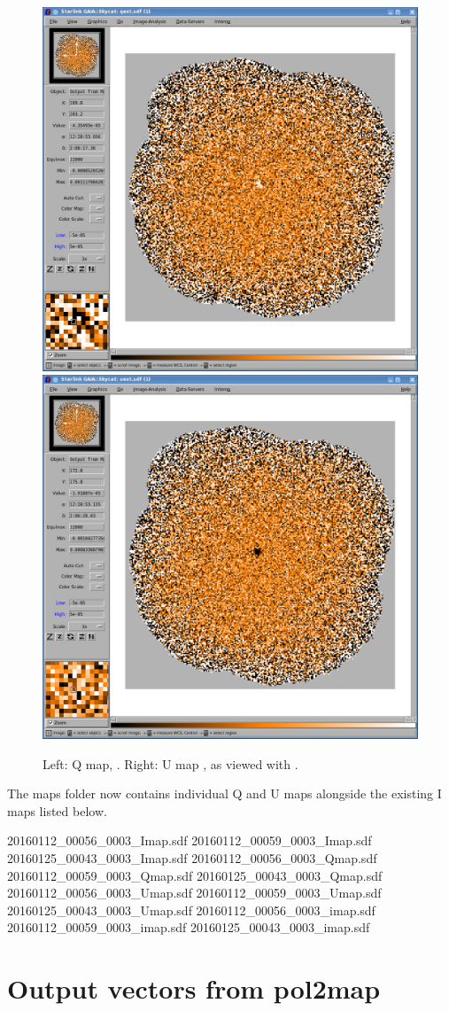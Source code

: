\begin{figure}[t!]
\begin{center}
\includegraphics[width=0.46\linewidth]{sc22-gaia-view-qext.png}
\includegraphics[width=0.46\linewidth]{sc22-gaia-view-uext.png}
\label{fig:gaia-qext-uext}
\caption [Q and U maps in GAIA]{
  \small Left: Q map, . Right: U map , as viewed with \GAIA.
}
\end{center}
\end{figure}



The maps folder now contains individual Q and U maps alongside the
existing I maps listed below.

\begin{terminalv}
20160112_00056_0003_Imap.sdf  20160112_00059_0003_Imap.sdf  20160125_00043_0003_Imap.sdf
20160112_00056_0003_Qmap.sdf  20160112_00059_0003_Qmap.sdf  20160125_00043_0003_Qmap.sdf
20160112_00056_0003_Umap.sdf  20160112_00059_0003_Umap.sdf  20160125_00043_0003_Umap.sdf
20160112_00056_0003_imap.sdf  20160112_00059_0003_imap.sdf  20160125_00043_0003_imap.sdf
\end{terminalv}




\section{Output vectors from pol2map}



